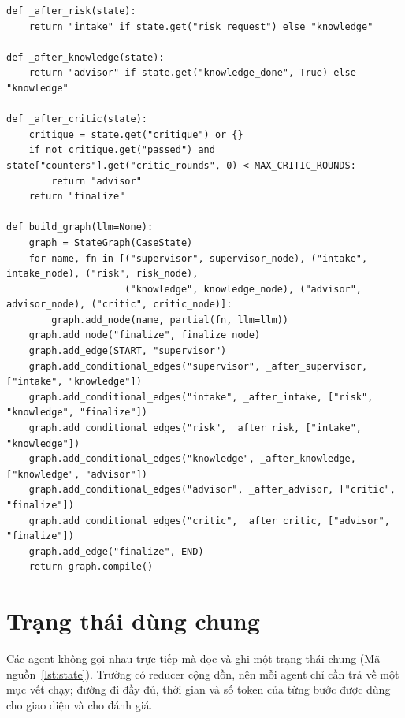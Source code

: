 \documentclass[12pt,a4paper]{report}
\newcommand{\codeinline}[1]{\texttt{\detokenize{#1}}}
\begin{document}
\begin{listing}[H]
\begin{verbatim}
def _after_risk(state):
    return "intake" if state.get("risk_request") else "knowledge"

def _after_knowledge(state):
    return "advisor" if state.get("knowledge_done", True) else "knowledge"

def _after_critic(state):
    critique = state.get("critique") or {}
    if not critique.get("passed") and state["counters"].get("critic_rounds", 0) < MAX_CRITIC_ROUNDS:
        return "advisor"
    return "finalize"

def build_graph(llm=None):
    graph = StateGraph(CaseState)
    for name, fn in [("supervisor", supervisor_node), ("intake", intake_node), ("risk", risk_node),
                     ("knowledge", knowledge_node), ("advisor", advisor_node), ("critic", critic_node)]:
        graph.add_node(name, partial(fn, llm=llm))
    graph.add_node("finalize", finalize_node)
    graph.add_edge(START, "supervisor")
    graph.add_conditional_edges("supervisor", _after_supervisor, ["intake", "knowledge"])
    graph.add_conditional_edges("intake", _after_intake, ["risk", "knowledge", "finalize"])
    graph.add_conditional_edges("risk", _after_risk, ["intake", "knowledge"])
    graph.add_conditional_edges("knowledge", _after_knowledge, ["knowledge", "advisor"])
    graph.add_conditional_edges("advisor", _after_advisor, ["critic", "finalize"])
    graph.add_conditional_edges("critic", _after_critic, ["advisor", "finalize"])
    graph.add_edge("finalize", END)
    return graph.compile()
\end{verbatim}
\caption{Dựng đồ thị agent bằng LangGraph (\texttt{agents/graph.py})}
\label{lst:graph}
\end{listing}

\section{Trạng thái dùng chung}
Các agent không gọi nhau trực tiếp mà đọc và ghi một trạng thái chung (Mã nguồn~\ref{lst:state}).
Trường \codeinline{trace} có reducer cộng dồn, nên mỗi agent chỉ cần trả về một mục vết chạy;
đường đi đầy đủ, thời gian và số token của từng bước được dùng cho giao diện và cho đánh giá.
\end{document}
